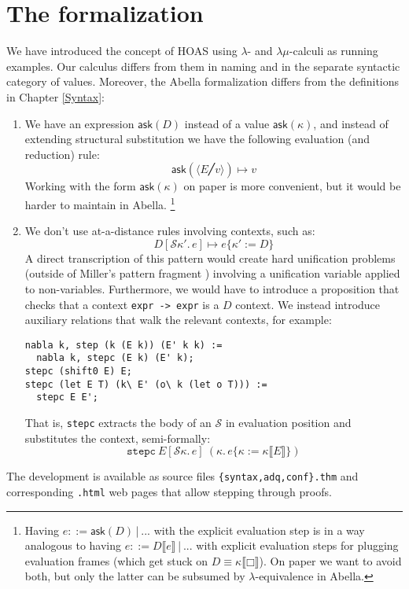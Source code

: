 \documentclass[a4paper, 11pt,titlepage, openright, twoside]{report}
\newcommand{\Ask}{\textsf{ask}}
\newcommand{\subst}[2]{\{#1{:=}#2\}}
\renewcommand{\S}{\mathcal{S}}
\newcommand{\+}{\enspace}
\begin{document}
\section{The formalization}
We have introduced the concept of HOAS using $λ$- and $λμ$-calculi as running examples.
Our calculus differs from them in naming and in the separate syntactic category of values.
Moreover, the Abella formalization differs from the definitions in Chapter \ref{Syntax}:
\begin{enumerate}
	\item
		We have an expression $\Ask(D)$ instead of a value $\Ask(κ)$,
		and instead of extending structural substitution we have the following evaluation (and reduction) rule:
		$$\Ask(⟨E╱v⟩) ↦ v$$
		Working with the form $\Ask(κ)$ on paper is more convenient,
		but it would be harder to maintain in Abella.%
		\footnote{
			Having $e ::= \Ask(D) │ ...$ with the explicit evaluation step is in a way analogous
			to having $e ::= D⟦e⟧ │ ...$ with explicit evaluation steps for plugging evaluation frames
			(which get stuck on $D ≡ κ⟦□⟧$).
			On paper we want to avoid both, but only the latter can be subsumed by $λ$-equivalence in Abella.
		}
	\item
		We don't use at-a-distance rules involving contexts, such as:
		$$D[\S κ'.\,e] ↦ e\subst{κ'}{D}$$
		A direct transcription of this pattern would create hard unification problems
		(outside of Miller's pattern fragment \cite{miller91})
		involving a unification variable applied to non-variables.
		Furthermore, we would have to introduce a proposition that checks
		that a context \lstinline{expr -> expr} is a $D$ context.
		We instead introduce auxiliary relations that walk the relevant contexts, for example:
		\begin{lstlisting}
nabla k, step (k (E k)) (E' k k) :=
  nabla k, stepc (E k) (E' k);
stepc (shift0 E) E;
stepc (let E T) (k\ E' (o\ k (let o T))) :=
  stepc E E';
		\end{lstlisting}
		That is, \lstinline{stepc} extracts the body of an $\S$ in evaluation position and substitutes the context, semi-formally:
		$$\texttt{stepc}\:E[\S κ.\,e] \:(κ.\,e\subst{κ}{κ⟦E⟧})$$
\end{enumerate}

The development is available as source files \texttt{\{syntax,adq,conf\}.thm}
and corresponding \texttt{.html} web pages that allow stepping through proofs.
\end{document}
